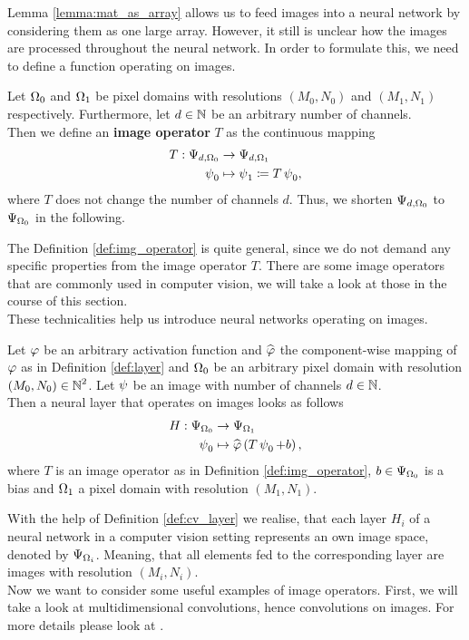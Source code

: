Lemma \ref{lemma:mat_as_array} allows us to feed images into a neural network by considering them as one large array. However, it still is unclear how the images are processed throughout the neural network. In order to formulate this, we need to define a function operating on images.

\begin{definition}\label{def:img_operator}
Let $\Omega_0$ and $\Omega_1$ be pixel domains with resolutions $(M_0,N_0)$ and $(M_1,N_1)$ respectively. Furthermore, let $d\in\operatorname{\mathbb{N}}$ be an arbitrary number of channels.\\
Then we define an \textbf{image operator} $T$ as the continuous mapping
\begin{align*}
T: \Psi_{d,\Omega_0} &\to \Psi_{d,\Omega_1}\\
\operatorname{\psi}_0 &\mapsto \operatorname{\psi}_1 \coloneqq T \operatorname{\psi}_0,
\end{align*}
where $T$ does not change the number of channels $d$. Thus, we shorten $\Psi_{d,\Omega_0}$ to $\Psi_{\Omega_0}$ in the following.
\end{definition}

The Definition \ref{def:img_operator} is quite general, since we do not demand any specific properties from the image operator $T$. There are some image operators that are commonly used in computer vision, we will take a look at those in the course of this section.\\
These technicalities help us introduce neural networks operating on images.

\begin{definition}\label{def:cv_layer}
Let $\operatorname{\varphi}$ be an arbitrary activation function and $\widehat{\operatorname{\varphi}}$ the component-wise mapping of $\operatorname{\varphi}$ as in Definition \ref{def:layer} and $\Omega_0$ be an arbitrary pixel domain with resolution $(M_0,N_0)\in\operatorname{\mathbb{N}}^2$. Let $\operatorname{\psi}$ be an image with number of channels $d\in\operatorname{\mathbb{N}}$.\\
Then a neural layer that operates on images looks as follows
\begin{align*}
H: \Psi_{\Omega_0} &\to \Psi_{\Omega_1}\\
\operatorname{\psi}_0 &\mapsto \widehat{\operatorname{\varphi}}\left(T\operatorname{\psi}_0 + b\right),
\end{align*}
where $T$ is an image operator as in Definition \ref{def:img_operator}, $b\in\Psi_{\Omega_0}$ is a bias and $\Omega_1$ a pixel domain with resolution $(M_1,N_1)$.
\end{definition}

With the help of Definition \ref{def:cv_layer} we realise, that each layer $H_i$ of a neural network in a computer vision setting represents an own image space, denoted by $\Psi_{\Omega_i}$. Meaning, that all elements fed to the corresponding layer are images with resolution $(M_i,N_i)$.\\
Now we want to consider some useful examples of image operators. First, we will take a look at multidimensional convolutions, hence convolutions on images. For more details please look at \cite[Chapter~9]{goodfellow2016deep}.

